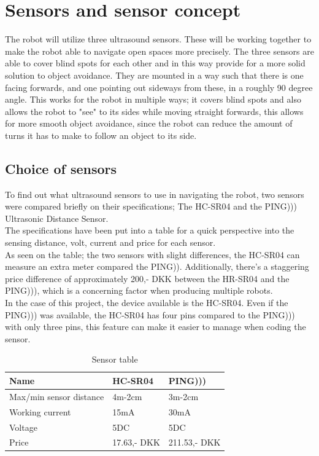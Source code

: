 \section{Sensors and sensor concept}
The robot will utilize three ultrasound sensors. These will be working together to make the robot able to navigate open spaces more precisely. The three sensors are able to cover blind spots for each other and in this way provide for a more solid solution to object avoidance. They are mounted in a way such that there is one facing forwards, and one pointing out sideways from these, in a roughly 90 degree angle. This works for the robot in multiple ways; it covers blind spots and also allows the robot to "see" to its sides while moving straight forwards, this allows for more smooth object avoidance, since the robot can reduce the amount of turns it has to make to follow an object to its side.

\subsection{Choice of sensors}
To find out what ultrasound sensors to use in navigating the robot, two sensors were compared briefly on their specifications; The HC-SR04 and the PING))) Ultrasonic Distance Sensor.\\
The specifications have been put into a table for a quick perspective into the sensing distance, volt, current and price for each sensor.\\

As seen on the table; the two sensors with slight differences, the HC-SR04 can measure an extra meter compared the PING)). Additionally, there's a staggering price difference of approximately 200,- DKK between the HR-SR04 and the PING))), which is a concerning factor when producing multiple robots.\\

In the case of this project, the device available is the HC-SR04. Even if the PING))) was available, the HC-SR04 has four pins compared to the PING))) with only three pins, this feature can make it easier to manage when coding the sensor.\\

\begin{table}[!ht]
\centering

\label{Sensor table}
\begin{tabular}{|l|l|l|}
\hline
\textbf{Name}           & HC-SR04   & PING)))    \\ \hline
Max/min sensor distance & 4m-2cm    & 3m-2cm     \\ \hline
Working current         & 15mA      & 30mA       \\ \hline
Voltage                 & 5DC       & 5DC        \\ \hline
Price                   & 17.63,- DKK & 211.53,- DKK \\ \hline
\end{tabular}
\caption{Sensor table \cite{HC-SR04} \cite{PING}}

\end{table}

